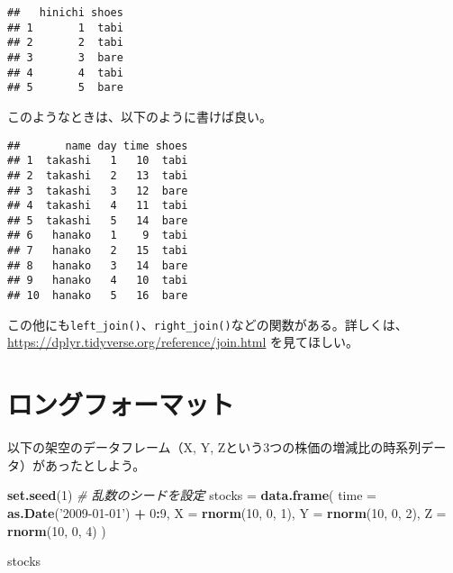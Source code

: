 \documentclass[]{book}
\newenvironment{Shaded}{\begin{snugshade}}{\end{snugshade}}
\newcommand{\KeywordTok}[1]{\textcolor[rgb]{0.13,0.29,0.53}{\textbf{#1}}}
\newcommand{\DataTypeTok}[1]{\textcolor[rgb]{0.13,0.29,0.53}{#1}}
\newcommand{\DecValTok}[1]{\textcolor[rgb]{0.00,0.00,0.81}{#1}}
\newcommand{\StringTok}[1]{\textcolor[rgb]{0.31,0.60,0.02}{#1}}
\newcommand{\CommentTok}[1]{\textcolor[rgb]{0.56,0.35,0.01}{\textit{#1}}}
\newcommand{\OperatorTok}[1]{\textcolor[rgb]{0.81,0.36,0.00}{\textbf{#1}}}
\newcommand{\NormalTok}[1]{#1}
\begin{document}
\begin{verbatim}
##   hinichi shoes
## 1       1  tabi
## 2       2  tabi
## 3       3  bare
## 4       4  tabi
## 5       5  bare
\end{verbatim}

このようなときは、以下のように書けば良い。

\begin{Shaded}
\end{Shaded}

\begin{verbatim}
##       name day time shoes
## 1  takashi   1   10  tabi
## 2  takashi   2   13  tabi
## 3  takashi   3   12  bare
## 4  takashi   4   11  tabi
## 5  takashi   5   14  bare
## 6   hanako   1    9  tabi
## 7   hanako   2   15  tabi
## 8   hanako   3   14  bare
## 9   hanako   4   10  tabi
## 10  hanako   5   16  bare
\end{verbatim}

この他にも\texttt{left\_join()}、\texttt{right\_join()}などの関数がある。詳しくは、\url{https://dplyr.tidyverse.org/reference/join.html}
を見てほしい。

\section{ロングフォーマット}

以下の架空のデータフレーム（X, Y,
Zという3つの株価の増減比の時系列データ）があったとしよう。

\begin{Shaded}
\begin{Highlighting}[]
\KeywordTok{set.seed}\NormalTok{(}\DecValTok{1}\NormalTok{) }\CommentTok{# 乱数のシードを設定}
\NormalTok{stocks =}\StringTok{ }\KeywordTok{data.frame}\NormalTok{(}
  \DataTypeTok{time =} \KeywordTok{as.Date}\NormalTok{(}\StringTok{'2009-01-01'}\NormalTok{) }\OperatorTok{+}\StringTok{ }\DecValTok{0}\OperatorTok{:}\DecValTok{9}\NormalTok{,}
  \DataTypeTok{X =} \KeywordTok{rnorm}\NormalTok{(}\DecValTok{10}\NormalTok{, }\DecValTok{0}\NormalTok{, }\DecValTok{1}\NormalTok{),}
  \DataTypeTok{Y =} \KeywordTok{rnorm}\NormalTok{(}\DecValTok{10}\NormalTok{, }\DecValTok{0}\NormalTok{, }\DecValTok{2}\NormalTok{),}
  \DataTypeTok{Z =} \KeywordTok{rnorm}\NormalTok{(}\DecValTok{10}\NormalTok{, }\DecValTok{0}\NormalTok{, }\DecValTok{4}\NormalTok{)}
\NormalTok{)}

\NormalTok{stocks}
\end{Highlighting}
\end{Shaded}
\end{document}
